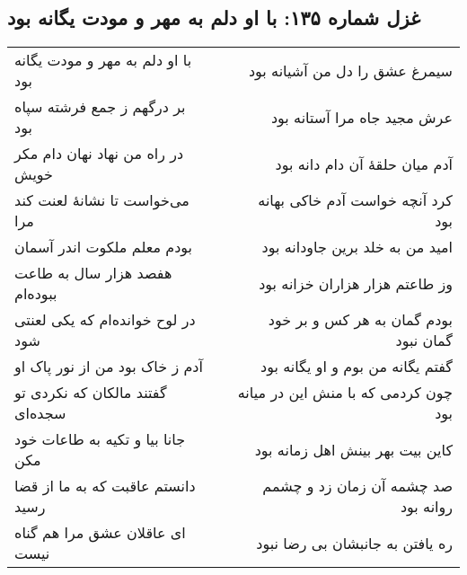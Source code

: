 \begin{center}
\section*{غزل شماره ۱۳۵: با او دلم به مهر و مودت یگانه بود}
\label{sec:135}
\begin{longtable}{l p{0.5cm} r}
با او دلم به مهر و مودت یگانه بود
&&
سیمرغ عشق را دل من آشیانه بود
\\
بر درگهم ز جمع فرشته سپاه بود
&&
عرش مجید جاه مرا آستانه بود
\\
در راه من نهاد نهان دام مکر خویش
&&
آدم میان حلقهٔ آن دام دانه بود
\\
می‌خواست تا نشانهٔ لعنت کند مرا
&&
کرد آنچه خواست آدم خاکی بهانه بود
\\
بودم معلم ملکوت اندر آسمان
&&
امید من به خلد برین جاودانه بود
\\
هفصد هزار سال به طاعت ببوده‌ام
&&
وز طاعتم هزار هزاران خزانه بود
\\
در لوح خوانده‌ام که یکی لعنتی شود
&&
بودم گمان به هر کس و بر خود گمان نبود
\\
آدم ز خاک بود من از نور پاک او
&&
گفتم یگانه من بوم و او یگانه بود
\\
گفتند مالکان که نکردی تو سجده‌ای
&&
چون کردمی که با منش این در میانه بود
\\
جانا بیا و تکیه به طاعات خود مکن
&&
کاین بیت بهر بینش اهل زمانه بود
\\
دانستم عاقبت که به ما از قضا رسید
&&
صد چشمه آن زمان زد و چشمم روانه بود
\\
ای عاقلان عشق مرا هم گناه نیست
&&
ره یافتن به جانبشان بی رضا نبود
\\
\end{longtable}
\end{center}
